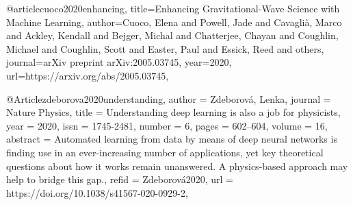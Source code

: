 @article{cuoco2020enhancing,
  title={Enhancing Gravitational-Wave Science with Machine Learning},
  author={Cuoco, Elena and Powell, Jade and Cavagli{\`a}, Marco and Ackley, Kendall and Bejger, Michal and Chatterjee, Chayan and Coughlin, Michael and Coughlin, Scott and Easter, Paul and Essick, Reed and others},
  journal={arXiv preprint arXiv:2005.03745},
  year={2020},
  url={https://arxiv.org/abs/2005.03745},
}


@Article{zdeborova2020understanding,
  author   = {Zdeborová, Lenka},
  journal  = {Nature Physics},
  title    = {Understanding deep learning is also a job for physicists},
  year     = {2020},
  issn     = {1745-2481},
  number   = {6},
  pages    = {602--604},
  volume   = {16},
  abstract = {Automated learning from data by means of deep neural networks is finding use in an ever-increasing number of applications, yet key theoretical questions about how it works remain unanswered. A physics-based approach may help to bridge this gap.},
  refid    = {Zdeborová2020},
  url      = {https://doi.org/10.1038/s41567-020-0929-2},
}

